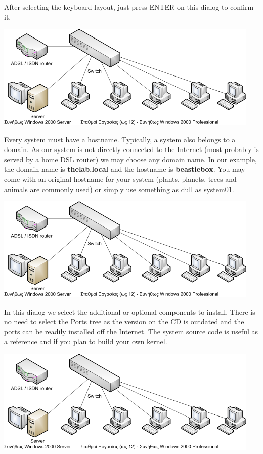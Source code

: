 \documentclass[a4paper,twoside,12pt]{article}
\begin{document}
After selecting the keyboard layout, just press ENTER on this dialog to confirm it.

\begin{center}
\includegraphics[width=0.95\textwidth]{images/main/school-lab}
\end{center}

Every system must have a hostname. Typically, a system also belongs to a domain. As our system is not directly connected to the Internet (most probably is served by a home DSL router) we may choose any domain name. In our example, the domain name is \textbf{thelab.local} and the hostname is \textbf{beastiebox}. You may come with an original hostname for your system (plants, planets, trees and animals are commonly used) or simply use something as dull as system01.

\begin{center}
\includegraphics[width=0.95\textwidth]{images/main/school-lab}
\end{center}

In this dialog we select the additional or optional components to install. There is no need to select the Ports tree as the version on the CD is outdated and the ports can be readily installed off the Internet. The system source code is useful as a reference and if you plan to build your own kernel.

\begin{center}
\includegraphics[width=0.95\textwidth]{images/main/school-lab}
\end{center}
\end{document}
